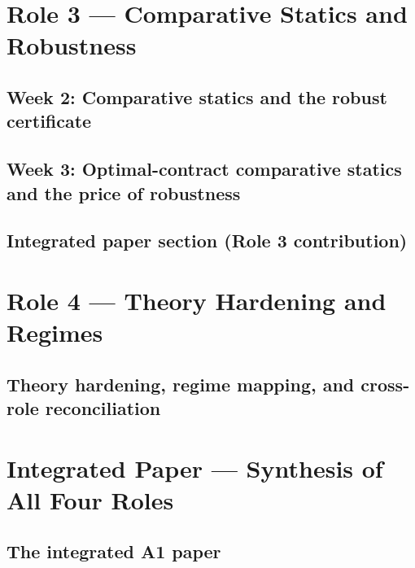 \documentclass[11pt,reqno]{report}
\theoremstyle{plain}
\theoremstyle{definition}
\theoremstyle{remark}
\begin{document}
\part{Role 3 --- Comparative Statics and Robustness}
\chapter{Week 2: Comparative statics and the robust certificate}

\chapter{Week 3: Optimal-contract comparative statics and the price of robustness}

\chapter{Integrated paper section (Role 3 contribution)}


\part{Role 4 --- Theory Hardening and Regimes}
\chapter{Theory hardening, regime mapping, and cross-role reconciliation}


\part{Integrated Paper --- Synthesis of All Four Roles}
\chapter{The integrated A1 paper}

\end{document}
